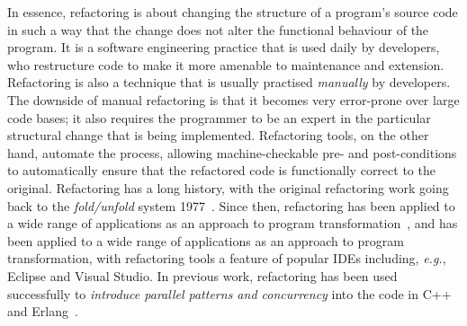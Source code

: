 \documentclass[a4paper,11pt]{article}
\begin{document}
In essence, refactoring is about changing the structure of a program's source code in such a way that the change does not alter the functional behaviour of the program. It is a software engineering practice that is used daily by developers, who restructure code to make it more amenable to maintenance and extension. Refactoring is also a technique that is usually practised \emph{manually} by developers. The downside of manual refactoring is that it becomes very error-prone over large code bases; it also requires the programmer to be an expert in the particular structural change that is being implemented. Refactoring tools, on the other hand, automate the process, allowing machine-checkable pre- and post-conditions to automatically ensure that the refactored code is functionally correct to the original. 
%
Refactoring has a long history, with the original refactoring work going back to the \emph{fold/unfold} system 1977~\cite{darlington77}. Since then, refactoring has been applied to a wide range of applications as an approach to program transformation~\cite{Mens:2004:SSR:972215.972286}, and has been applied to a wide range of applications as an approach to program transformation, with refactoring tools a feature of popular IDEs including, \textit{e.g.}, Eclipse and Visual Studio.
In previous work, refactoring has been used successfully to \emph{introduce parallel patterns and concurrency} into the code in C++~\cite{brownagricultural,DBLP:conf/pdp/JanjicBMHDAG16, mcts} and Erlang~\cite{hlpp,DBLP:journals/cai/BarwellBHTB16}. %
%
\end{document}
